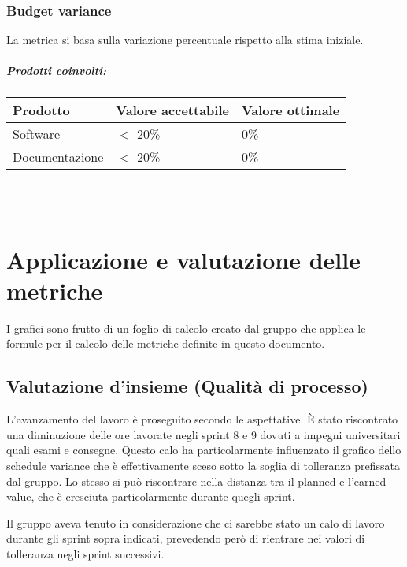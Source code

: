 \documentclass[a4paper, 12pt]{article}
\begin{document}
\subsubsection{Budget variance}
La metrica si basa sulla variazione percentuale rispetto alla stima iniziale.

\subparagraph{Prodotti coinvolti:}
\begin{center}
	\begin{tabularx}{\textwidth}{|X|X|X|}
		\hline
		\textbf{Prodotto} & \textbf{Valore accettabile } & \textbf{Valore ottimale } \\
		\hline
		Software          & $<$ 20\%                     & 0\%                       \\
		\hline
		Documentazione    & $<$ 20\%                     & 0\%                       \\
		\hline
	\end{tabularx}\\[8pt]
	\mbox{}\\
\end{center}

\section {Applicazione e valutazione delle metriche}
I grafici sono frutto di un foglio di calcolo creato dal gruppo che applica le formule per il calcolo delle metriche definite in questo documento.
\subsection{Valutazione d’insieme (Qualità di processo)}
L'avanzamento del lavoro è proseguito secondo le aspettative.
È stato riscontrato una diminuzione delle ore lavorate negli sprint 8 e 9 dovuti 
a impegni universitari quali esami e consegne. 
Questo calo ha particolarmente 
influenzato il grafico dello schedule variance che è effettivamente sceso sotto la soglia di tolleranza prefissata dal gruppo. 
Lo stesso si può riscontrare nella distanza tra il planned e l’earned value, che 
è cresciuta particolarmente durante quegli sprint. 

Il gruppo aveva tenuto in considerazione che ci sarebbe stato un calo di lavoro 
durante gli sprint sopra indicati, prevedendo però di rientrare nei valori di tolleranza negli sprint successivi.
\end{document}
